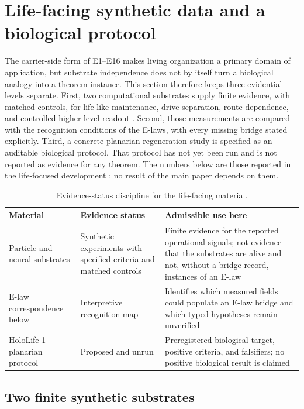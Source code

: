 \section{Life-facing synthetic data and a biological protocol}
\label{supp:life}

The carrier-side form of E1--E16 makes living organization a primary domain
of application, but substrate independence does not by itself turn a
biological analogy into a theorem instance.  This section therefore keeps
three evidential levels separate.  First, two computational
substrates supply finite evidence, with matched controls, for life-like maintenance,
drive separation, route dependence, and controlled higher-level readout
\citep{Tsiokos2026Life}.  Second, those measurements are compared with the
recognition conditions of the E-laws, with every missing bridge stated
explicitly.  Third, a concrete planarian regeneration study is specified as
an auditable biological protocol.  That protocol has not yet been run and is
not reported as evidence for any theorem.
The numbers below are those reported in the life-focused development
\citep{Tsiokos2026Life}; no result of the main paper depends on them.

\begin{table}[htbp]
\centering
\small
\begin{tabularx}{\textwidth}{@{}lXX@{}}
\toprule
Material & Evidence status & Admissible use here \\
\midrule
Particle and neural substrates &
Synthetic experiments with specified criteria and matched controls &
Finite evidence for the reported operational signals; not evidence that the
substrates are alive and not, without a bridge record, instances of an E-law
\\
E-law correspondence below &
Interpretive recognition map &
Identifies which measured fields could populate an E-law bridge and which
typed hypotheses remain unverified \\
HoloLife-1 planarian protocol &
Proposed and unrun &
Preregistered biological target, positive criteria, and falsifiers; no
positive biological result is claimed \\
\bottomrule
\end{tabularx}
\caption{Evidence-status discipline for the life-facing material.}
\label{tab:life-evidence-status}
\end{table}

\subsection{Two finite synthetic substrates}


